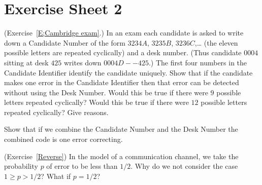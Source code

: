 \section{Exercise Sheet 2}
\begin{question}\label{C2.1}(Exercise~\ref{E;Cambridge exam}.)
In an exam
each candidate is asked to write down a Candidate Number of the
form $3234A$, $3235B$, $3236C$,\dots 
(the eleven possible letters are repeated cyclically)
and a desk number. (Thus candidate $0004$ sitting at desk $425$
writes down $0004D--425$.)
The first four numbers
in the Candidate Identifier identify the candidate
uniquely. 
Show that if the candidate makes one error
in the Candidate Identifier
then that error can be detected
without using the Desk Number.
Would this be true if there were $9$ possible
letters repeated cyclically? Would this be true
if there were $12$ possible
letters repeated cyclically?
Give reasons.

Show that if we combine the Candidate Number and
the Desk Number the combined code is one error correcting.
\end{question}
\begin{question}\label{C2.2}
(Exercise~\ref{Reverse}) In the model of a communication
channel, we take the probability $p$ of error
to be less than $1/2$.
Why do we not consider
the case $1\geq p>1/2$? What
if $p=1/2$?
\end{question}
